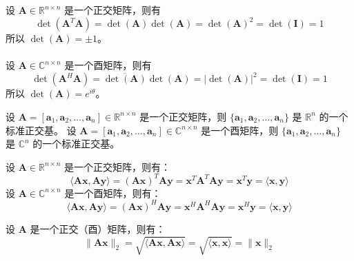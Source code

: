 \begin{proposition}[正交（酉）矩阵的行列式的绝对值为 1]
    设 $\mathbf{A} \in \mathbb{R}^{n \times n}$ 是一个正交矩阵，则有
    \[
        \det(\mathbf{A}^T \mathbf{A}) = \det(\mathbf{A})\det(\mathbf{A}) = \det(\mathbf{A})^2 = \det(\mathbf{I}) = 1
    \]
    所以 $\det(\mathbf{A}) = \pm 1$。
    \\
    \\
    设 $\mathbf{A} \in \mathbb{C}^{n \times n}$ 是一个酉矩阵，则有
    \[
        \det(\mathbf{A}^H \mathbf{A})  = \overline{\det(\mathbf{A})} \det(\mathbf{A})  = |\det(\mathbf{A})|^2 = \det(\mathbf{I}) = 1
    \]
    所以 $\det(\mathbf{A}) = e^{i\theta}$。
\end{proposition}

\begin{proposition}
    设 $\mathbf{A} = [\mathbf{a}_1,\mathbf{a}_2,\ldots,\mathbf{a}_n] \in \mathbb{R}^{n \times n}$ 是一个正交矩阵，则 $\{\mathbf{a}_1,\mathbf{a}_2,\ldots,\mathbf{a}_n\}$ 是 $\mathbb{R}^n$ 的一个标准正交基。
    设 $\mathbf{A} = [\mathbf{a}_1,\mathbf{a}_2,\ldots,\mathbf{a}_n] \in \mathbb{C}^{n \times n}$ 是一个酉矩阵，则 $\{\mathbf{a}_1,\mathbf{a}_2,\ldots,\mathbf{a}_n\}$ 是 $\mathbb{C}^n$ 的一个标准正交基。
\end{proposition}

\vspace{1em}
\begin{proposition}[正交（酉）矩阵是保内积的线性变换]
    设 $\mathbf{A} \in \mathbb{R}^{n \times n}$ 是一个正交矩阵，则有：
    \[
        \langle \mathbf{A}\mathbf{x},\mathbf{A}\mathbf{y} \rangle = (\mathbf{A}\mathbf{x})^T \mathbf{A}\mathbf{y}  = \mathbf{x}^T \mathbf{A}^T \mathbf{A} \mathbf{y} = \mathbf{x}^T \mathbf{y} = \langle \mathbf{x},\mathbf{y} \rangle
    \]
    设 $\mathbf{A} \in \mathbb{C}^{n \times n}$ 是一个酉矩阵，则有：
    \[
        \langle \mathbf{A}\mathbf{x},\mathbf{A}\mathbf{y} \rangle = (\mathbf{A}\mathbf{x})^H \mathbf{A}\mathbf{y}  = \mathbf{x}^H \mathbf{A}^H \mathbf{A} \mathbf{y} = \mathbf{x}^H \mathbf{y} = \langle \mathbf{x},\mathbf{y} \rangle
    \]
\end{proposition}

\begin{corollary}[正交（酉）矩阵是保长度的线性变换]
    设 $\mathbf{A}$ 是一个正交（酉）矩阵，则有：
    \[
        \|\mathbf{A}\mathbf{x}\|_2 = \sqrt{\langle \mathbf{A}\mathbf{x},\mathbf{A}\mathbf{x} \rangle} = \sqrt{\langle \mathbf{x},\mathbf{x} \rangle} = \|\mathbf{x}\|_2
    \]
\end{corollary}

